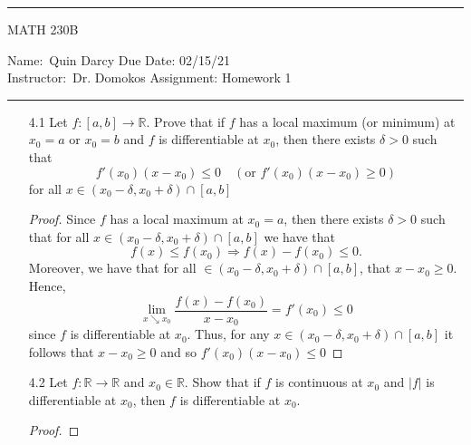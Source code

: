 \documentclass[12pt]{article}
\theoremstyle{definition}
\newcommand{\abs}[1]{\lvert #1 \rvert}
\begin{document}
    \thispagestyle{empty}\hrule

    \begin{center}
        \vspace{.4cm} { \large MATH 230B}
    \end{center}
    {Name:\ Quin Darcy \hspace{\fill} Due Date: 02/15/21   \\
    { Instructor:}\ Dr. Domokos \hspace{\fill} Assignment:
    Homework 1 \\ \hrule}

    \begin{enumerate}
        \item[4.1] Let $f:[a, b]\to\mathbb{R}$. Prove that if $f$ has a local
        maximum (or minimum) at $x_0=a$ or $x_0=b$ and $f$ is differentiable at
        $x_0$, then there exists $\delta>0$ such that
            \begin{equation*}
                f'(x_0)(x-x_0)\leq 0\quad(\text{or }f'(x_0)(x-x_0)\geq 0)
            \end{equation*}
        for all $x\in(x_0-\delta, x_0+\delta)\cap[a, b]$
            \begin{proof}
                Since $f$ has a local maximum at $x_0=a$, then there exists
                $\delta>0$ such that for all $x\in(x_0-\delta,
                x_0+\delta)\cap[a, b]$ we have that 
                    \begin{equation*}
                        f(x)\leq f(x_0)\Rightarrow f(x)-f(x_0)\leq 0.
                    \end{equation*}
                Moreover, we have that for all $\in(x_0-\delta,
                x_0+\delta)\cap[a, b]$, that $x-x_0\geq 0$. Hence, 
                    \begin{equation*}
                        \lim_{x\searrow x_0}\frac{f(x)-f(x_0)}{x-x_0}=f'(x_0)\leq 0
                    \end{equation*}
                since $f$ is differentiable at $x_0$. Thus, for any
                $x\in(x_0-\delta, x_0+\delta)\cap[a, b]$ it follows that
                $x-x_0\geq 0$ and so $f'(x_0)(x-x_0)\leq 0$
            \end{proof}
        \item[4.2] Let $f:\mathbb{R}\to\mathbb{R}$ and $x_0\in\mathbb{R}$. Show
            that if $f$ is continuous at $x_0$ and $\abs{f}$ is differentiable
            at $x_0$, then $f$ is differentiable at $x_0$.
            \begin{proof}

\end{proof}
\end{enumerate}
\end{document}
